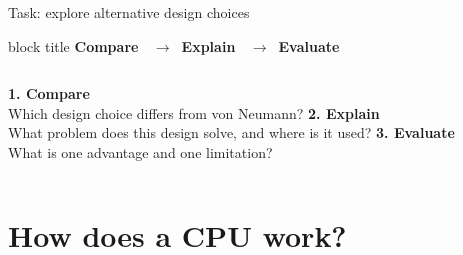 \documentclass[aspectratio=169,10pt]{beamer}
\begin{document}
\begin{frame}{Task: explore alternative design choices}
  \vspace{0.08cm}
  \begin{beamercolorbox}[rounded=true,sep=0.08cm,wd=\textwidth]{block title}
    \centering\small\textbf{Compare \ $\rightarrow$\ Explain \ $\rightarrow$\ Evaluate}
  \end{beamercolorbox}
  \begin{columns}[T,onlytextwidth]
    \centering\small
      \textbf{1. Compare}\\[-1mm]
      Which design choice differs from von Neumann?
    \centering\small
      \textbf{2. Explain}\\[-1mm]
      What problem does this design solve, and where is it used?
    \centering\small
      \textbf{3. Evaluate}\\[-1mm]
      What is one advantage and one limitation?
  \end{columns}

\end{frame}

\section{How does a CPU work?}
\end{document}
